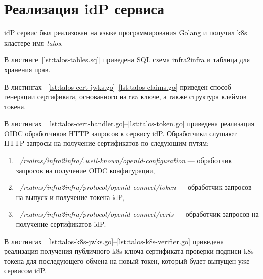 \section{Реализация idP сервиса}

idP сервис был реализован на языке программирования Golang и получил k8s кластере имя \textit{talos}.

В листинге~\ref{lst:talos-tables.sql} приведена SQL схема infra2infra и таблица для хранения прав.


В листингах ~\ref{lst:talos-cert-jwks.go}--\ref{lst:talos-claims.go} приведен способ генерации сертификата, основанного на rsa ключе, а также структура клеймов токена.

%

В листингах ~\ref{lst:talos-cert-handler.go}--\ref{lst:talos-token.go} приведена реализация OIDC обработчиков HTTP запросов к сервису idP.
Обработчики слушают HTTP запросы на получение сертификатов по следующим путям:
\begin{enumerate}
\item ~\textit{/realms/infra2infra/.well-known/openid-configuration} --- обработчик запросов на получение OIDC конфигурации,
\item ~\textit{/realms/infra2infra/protocol/openid-connect/token} --- обработчик запросов на выпуск и получение токена idP,
\item ~\textit{/realms/infra2infra/protocol/openid-connect/certs} --- обработчик запросов на получение сертификатов idP.
\end{enumerate}

%	
%

В листингах ~\ref{lst:talos-k8s-jwks.go}--\ref{lst:talos-k8s-verifier.go} приведена реализация получения публичного k8s ключа сертификата проверки подписи k8s токена для последующего обмена на новый токен, который будет выпущен уже сервисом idP.

%


